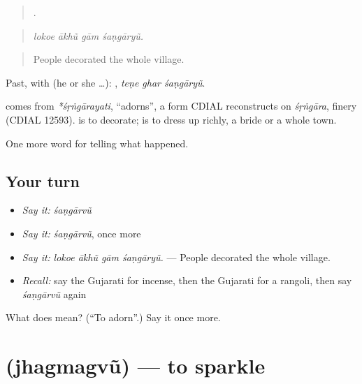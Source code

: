 \begin{quote}
   .
\end{quote}

\begin{quote}
\emph{lokoe ākhũ gām śaṇgāryũ.}
\end{quote}

\begin{quote}
People decorated the whole village.
\end{quote}

Past, with  (he or she …):   , \emph{teṇe ghar śaṇgāryũ}.

\begin{cousinweb}
comes from \emph{*śṛṅgārayati}, \textquotedblleft{}adorns\textquotedblright{}, a form CDIAL reconstructs on \emph{śṛṅgāra}, finery (CDIAL 12593). \textbf{} is to decorate; \textbf{} is to dress up richly, a bride or a whole town.
\end{cousinweb}

\begin{grammarlens}[title={What you've built}]
One more word for telling what happened.
\end{grammarlens}

\subsection*{Your turn}
\begin{itemize}
\raggedright
  \item \emph{Say it:} \emph{śaṇgārvũ}
  \item \emph{Say it:} \emph{śaṇgārvũ}, once more
  \item \emph{Say it:} \emph{lokoe ākhũ gām śaṇgāryũ.} — People decorated the whole village.
  \item \emph{Recall:} say the Gujarati for incense, then the Gujarati for a rangoli, then say \emph{śaṇgārvũ} again
\end{itemize}

\begin{tcolorbox}[breakable,colback=teal!4,colframe=teal!35!black,title={Before you move on}]
What does  mean? (\textquotedblleft{}To adorn\textquotedblright{}.) Say it once more.
\end{tcolorbox}
\section[\texorpdfstring{\gu{ઝગમગવું} (jhagmagvũ)}{ઝગમગવું (jhagmagvũ)}]{ (jhagmagvũ) — to sparkle}

